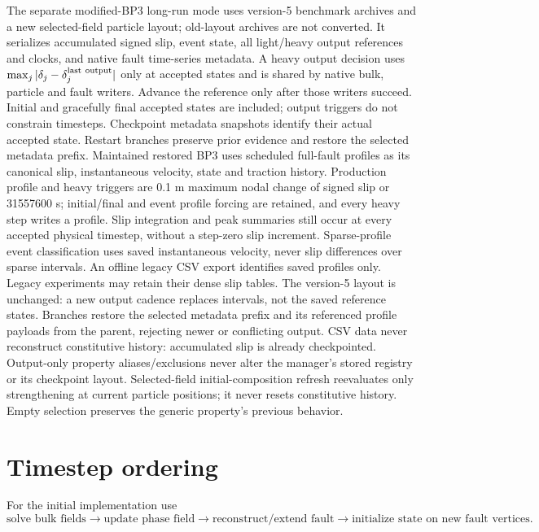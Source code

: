 \documentclass[11pt]{article}
\begin{document}
The separate modified-BP3 long-run mode uses version-5 benchmark archives and
a new selected-field particle layout; old-layout archives are not converted.
It serializes accumulated signed slip, event state, all light/heavy output
references and clocks, and native fault time-series metadata. A heavy output
decision uses $\max_j|\delta_j-\delta_j^{\rm last\ output}|$ only at accepted
states and is shared by native bulk, particle and fault writers. Advance the
reference only after those writers succeed. Initial and gracefully final
accepted states are included; output triggers do not constrain timesteps.
Checkpoint metadata snapshots identify their actual accepted state. Restart
branches preserve prior evidence and restore the selected metadata prefix.
Maintained restored BP3 uses scheduled full-fault profiles as its canonical
slip, instantaneous velocity, state and traction history. Production profile
and heavy triggers are 0.1 m maximum nodal change of signed slip or 31557600 s;
initial/final and event profile forcing are retained, and every heavy step
writes a profile. Slip integration and peak summaries still occur at every
accepted physical timestep, without a step-zero slip increment. Sparse-profile
event classification uses saved instantaneous velocity, never slip differences
over sparse intervals. An offline legacy CSV export identifies saved profiles
only. Legacy experiments may retain their dense slip tables.
The version-5 layout is unchanged: a new output cadence replaces intervals,
not the saved reference states. Branches restore the selected metadata prefix
and its referenced profile payloads from the parent, rejecting newer or
conflicting output. CSV data never reconstruct constitutive history:
accumulated slip is already checkpointed. Output-only property aliases/exclusions never alter
the manager's stored registry or its checkpoint layout.
Selected-field initial-composition refresh reevaluates only strengthening at
current particle positions; it never resets constitutive history. Empty
selection preserves the generic property's previous behavior.

\section{Timestep ordering}

For the initial implementation use
\[
\boxed{
\text{solve bulk fields}
\rightarrow
\text{update phase field}
\rightarrow
\text{reconstruct/extend fault}
\rightarrow
\text{initialize state on new fault vertices}.
}
\]
\end{document}
